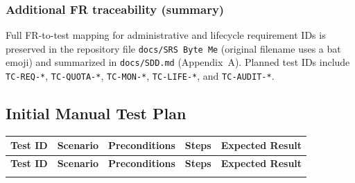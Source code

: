 \documentclass[12pt,a4paper]{article}
\begin{document}
\subsubsection{Additional FR traceability (summary)}
Full FR-to-test mapping for administrative and lifecycle requirement IDs is preserved in the repository file \texttt{docs/SRS  Byte Me} (original filename uses a bat emoji) and summarized in \texttt{docs/SDD.md} (Appendix~A). Planned test IDs include \texttt{TC-REQ-*}, \texttt{TC-QUOTA-*}, \texttt{TC-MON-*}, \texttt{TC-LIFE-*}, and \texttt{TC-AUDIT-*}.

\newpage
\subsection{Initial Manual Test Plan}

\begin{longtable}{@{}L{2cm}L{3cm}L{3cm}L{3.5cm}L{3cm}@{}}
  
    \textbf{Test ID} & \textbf{Scenario} & \textbf{Preconditions} & \textbf{Steps} & \textbf{Expected Result} \\
  \midrule
  \endfirsthead
  
    \textbf{Test ID} & \textbf{Scenario} & \textbf{Preconditions} & \textbf{Steps} & \textbf{Expected Result} \\
  \midrule
  \endhead
  
  \endfoot


\end{longtable}
\end{document}
